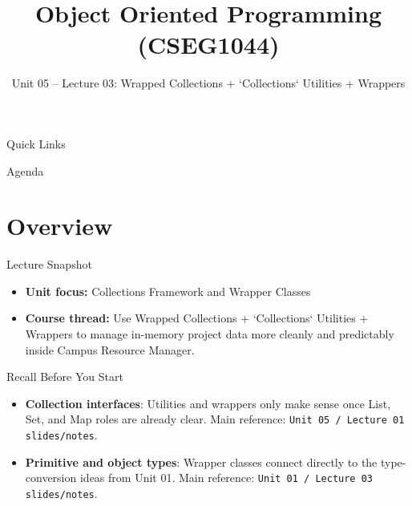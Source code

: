 \documentclass{beamer}
\title[OOPS with Java]{Object Oriented Programming (CSEG1044)}
\subtitle{Unit 05 -- Lecture 03: Wrapped Collections + `Collections` Utilities + Wrappers}
\begin{document}
\begin{frame}[fragile]
  \titlepage
  \vspace{0.5em}
  \slidesources{\OOPSUnitVSources}
\end{frame}

\begin{frame}{Quick Links}
  \centering
  \hyperlink{sec:overview}{}\hspace{0.6em}
  \hyperlink{sec:concepts}{}\hspace{0.6em}
  \hyperlink{sec:demo}{}\hspace{0.6em}
  \hyperlink{sec:summary}{}
  \slidesources{\OOPSUnitVSources}
\end{frame}

\begin{frame}{Agenda}
  \tableofcontents
  \slidesources{\OOPSUnitVSources}
\end{frame}

\section{Overview}
\label{sec:overview}

\begin{frame}{Lecture Snapshot}
\begin{itemize}[<+->]
  \item \textbf{Unit focus:} Collections Framework and Wrapper Classes
  \item \textbf{Course thread:} Use Wrapped Collections + `Collections` Utilities + Wrappers to manage in-memory project data more cleanly and predictably inside Campus Resource Manager.
\end{itemize}
  \slidesources{\OOPSUnitVSources}
\end{frame}

\begin{frame}{Recall Before You Start}
\begin{itemize}[<+->]
  \item \textbf{Collection interfaces}: Utilities and wrappers only make sense once List, Set, and Map roles are already clear. Main reference: \texttt{Unit 05 / Lecture 01 slides/notes}.
  \item \textbf{Primitive and object types}: Wrapper classes connect directly to the type-conversion ideas from Unit 01. Main reference: \texttt{Unit 01 / Lecture 03 slides/notes}.
\end{itemize}
  \slidesources{\OOPSUnitVSources}
\end{frame}
\end{document}
